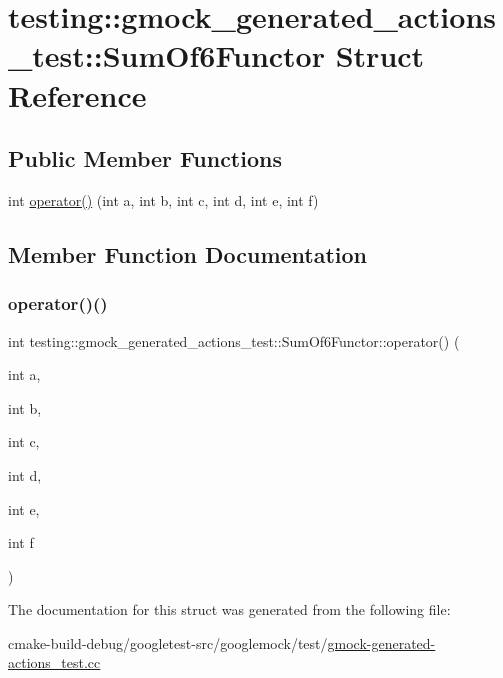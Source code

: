 \hypertarget{structtesting_1_1gmock__generated__actions__test_1_1SumOf6Functor}{}\section{testing\+::gmock\+\_\+generated\+\_\+actions\+\_\+test\+::Sum\+Of6\+Functor Struct Reference}
\label{structtesting_1_1gmock__generated__actions__test_1_1SumOf6Functor}
\subsection*{Public Member Functions}
\begin{DoxyCompactItemize}
\item 
int \mbox{\hyperlink{structtesting_1_1gmock__generated__actions__test_1_1SumOf6Functor_adb500f7bdfa5a5887623fa38cd805e41}{operator()}} (int a, int b, int c, int d, int e, int f)
\end{DoxyCompactItemize}


\subsection{Member Function Documentation}
\mbox{\label{structtesting_1_1gmock__generated__actions__test_1_1SumOf6Functor_adb500f7bdfa5a5887623fa38cd805e41}} 
\subsubsection{\texorpdfstring{operator()()}{operator()()}}
{\footnotesize\ttfamily int testing\+::gmock\+\_\+generated\+\_\+actions\+\_\+test\+::\+Sum\+Of6\+Functor\+::operator() (\begin{DoxyParamCaption}\item[{int}]{a,  }\item[{int}]{b,  }\item[{int}]{c,  }\item[{int}]{d,  }\item[{int}]{e,  }\item[{int}]{f }\end{DoxyParamCaption})\hspace{0.3cm}{\ttfamily [inline]}}



The documentation for this struct was generated from the following file\+:\begin{DoxyCompactItemize}
\item 
cmake-\/build-\/debug/googletest-\/src/googlemock/test/\mbox{\hyperlink{gmock-generated-actions__test_8cc}{gmock-\/generated-\/actions\+\_\+test.\+cc}}\end{DoxyCompactItemize}
